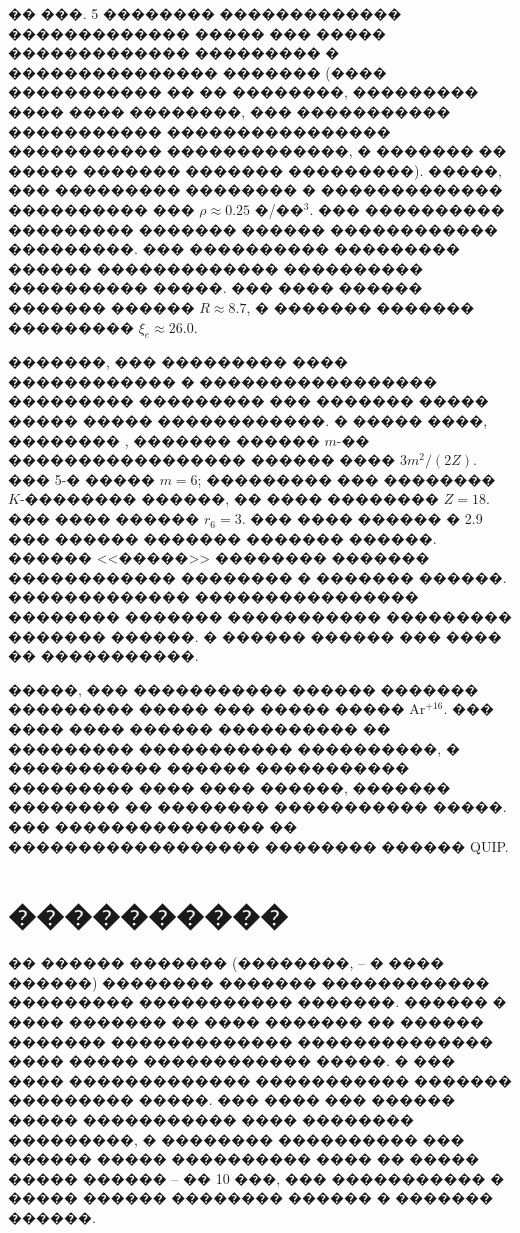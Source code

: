 \documentclass[12pt,titlepage]{article}
\begin{document}
�� ���. 5 �������� ������������� ������������� ����� ��� ����� ������������� ��������� � ��������������� ������� (���� ����������� �� �� ��������, ��������� ���� ���� ��������, ��� ����������� ����������� ���������������� ����������� �������������, � ������� �� ����� ������� ������� ���������). �����, ��� ��������� �������� � ������������� ���������� ��� $\rho \approx 0.25$ �/��$^3$. ��� ���������� ��������� ������� ������ ������������ ���������. ��� ���������� ��������� ������ ������������� ���������� ���������� �����. ��� ���� ������ ������� ������ $R \approx 8.7$, � ������� ������� ��������� $\xi_e \approx 26.0$.

�������, ��� ��������� ���� ������������ � ����������������� ��������� ��������� ��� ������� ����� ����� ����� ������������. � ����� ����, �������� \cite{Landau}, ������� ������ $m$-�� ����������������� ������ ���� $3 m^2/(2Z)$. ��� 5-� ����� $m = 6$; ��������� ��� �������� $K$-�������� ������, �� ���� �������� $Z = 18$. ��� ���� ������ $r_6 = 3$. ��� ���� ������  � 2.9 ��� ������ ������� ������� ������. ������ <<�����>> �������� ������� ������������ �������� � ������� ������. ������������� ���������������� �������� ������� ����������� ��������� ������� ������. � ������ ������ ��� ���� �� �����������.

�����, ��� ����������� ������ ������� ��������� ����� ��� ����� ����� Ar$^{+16}$. ��� ���� ���� ������ ���������� �� ��������� ����������� ����������, � ����������� ������ ����������� ��������� ���� ���� ������, ������� �������� �� �������� ����������� �����. ��� ��������������� ��  ������������������ �������� ������ QUIP.

\section{����������}

�� ������ ������� (��������, \cite{Delamater1985} -- \cite{Demura2018} � ���� ������) �������� ������� ������������ ��������� ����������� �������. ������ � ���� ������� �� ���� ������� �� ������ ������� ������������� �������������� ���� ����� ������������ �����. � ��� ���� ������������� ����������� ������� ��������� �����. ��� ���� ��� ������ ����� ����������� ���� �������� ���������, � �������� ���������� ��� ������ ����� ���������� ���� �� ����� ����� ������ -- �� 10 ���, ��� ����������� � ����� ������ �������� ������ � ������� ������.
\end{document}
